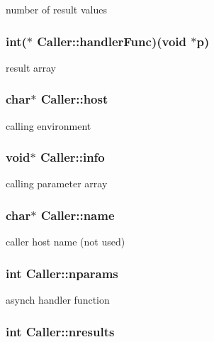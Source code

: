 number of result values \hypertarget{structCaller_05f32e75bb7528cc2f545e106efa8803}{
\subsubsection[{handlerFunc}]{\setlength{\rightskip}{0pt plus 5cm}int($\ast$ {\bf Caller::handlerFunc})(void $\ast$p)}}
\label{structCaller_05f32e75bb7528cc2f545e106efa8803}


result array \hypertarget{structCaller_67413ee10f064354a789c92374d1f823}{
\subsubsection[{host}]{\setlength{\rightskip}{0pt plus 5cm}char$\ast$ {\bf Caller::host}}}
\label{structCaller_67413ee10f064354a789c92374d1f823}


calling environment \hypertarget{structCaller_a99bc0344a1f25e580ead02f48675c58}{
\subsubsection[{info}]{\setlength{\rightskip}{0pt plus 5cm}void$\ast$ {\bf Caller::info}}}
\label{structCaller_a99bc0344a1f25e580ead02f48675c58}


calling parameter array \hypertarget{structCaller_6b7a50fb0cf0da41c01662088de4d79e}{
\subsubsection[{name}]{\setlength{\rightskip}{0pt plus 5cm}char$\ast$ {\bf Caller::name}}}
\label{structCaller_6b7a50fb0cf0da41c01662088de4d79e}


caller host name (not used) \hypertarget{structCaller_1dbd14c65b8f3e0046ec1dc73f6f69f9}{
\subsubsection[{nparams}]{\setlength{\rightskip}{0pt plus 5cm}int {\bf Caller::nparams}}}
\label{structCaller_1dbd14c65b8f3e0046ec1dc73f6f69f9}


asynch handler function \hypertarget{structCaller_d8f29c03ab60a299089385d5e82aa8c6}{
\subsubsection[{nresults}]{\setlength{\rightskip}{0pt plus 5cm}int {\bf Caller::nresults}}}
\label{structCaller_d8f29c03ab60a299089385d5e82aa8c6}


